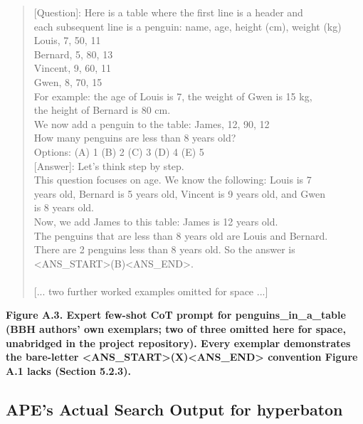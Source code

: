 \documentclass[a4paper,fleqn]{cas-sc}
\begin{document}
\centering
\begin{quote}\ttfamily\small
[Question]: Here is a table where the first line is a header and\\{}
each subsequent line is a penguin: name, age, height (cm), weight (kg)\\{}
Louis, 7, 50, 11\\{}
Bernard, 5, 80, 13\\{}
Vincent, 9, 60, 11\\{}
Gwen, 8, 70, 15\\{}
For example: the age of Louis is 7, the weight of Gwen is 15 kg,\\{}
the height of Bernard is 80 cm.\\{}
We now add a penguin to the table: James, 12, 90, 12\\{}
How many penguins are less than 8 years old?\\{}
Options: (A) 1 (B) 2 (C) 3 (D) 4 (E) 5\\{}
[Answer]: Let's think step by step.\\{}
This question focuses on age. We know the following: Louis is 7\\{}
years old, Bernard is 5 years old, Vincent is 9 years old, and Gwen\\{}
is 8 years old.\\{}
Now, we add James to this table: James is 12 years old.\\{}
The penguins that are less than 8 years old are Louis and Bernard.\\{}
There are 2 penguins less than 8 years old. So the answer is\\{}
<ANS\_\allowbreak{}START>(B)<ANS\_\allowbreak{}END>.\\{}
~\\{}
[... two further worked examples omitted for space ...]\\{}
\end{quote}
\par\noindent\textbf{Figure A.3. Expert few-shot CoT prompt for penguins\_\allowbreak{}in\_\allowbreak{}a\_\allowbreak{}table (BBH authors' own exemplars; two of three omitted here for space, unabridged in the project repository). Every exemplar demonstrates the bare-letter <ANS\_\allowbreak{}START>(X)<ANS\_\allowbreak{}END> convention Figure A.1 lacks (Section 5.2.3).}

\subsection{APE's Actual Search Output for hyperbaton}
\end{document}
